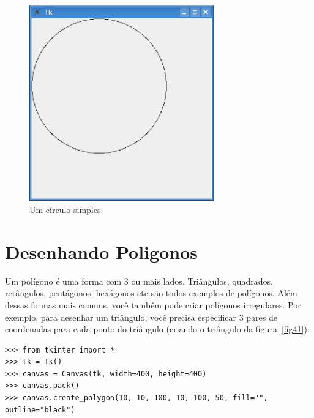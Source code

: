 \begin{figure}
\begin{center}
\includegraphics[width=80mm]{eps/figure40.eps}
\end{center}
\caption{Um círculo simples.}\label{fig40}
\end{figure}

\section{Desenhando Poligonos}

Um polígono é uma forma com 3 ou mais lados. Triângulos, quadrados, retângulos, pentágonos, hexágonos etc são todos exemplos de polígonos. Além dessas formas mais comuns, você também pode criar polígonos irregulares. Por exemplo, para desenhar um triângulo, você precisa especificar 3 pares de coordenadas para cada ponto do triângulo (criando o triângulo da figura~\ref{fig41}):

\begin{listing}
\begin{verbatim}
>>> from tkinter import *
>>> tk = Tk()
>>> canvas = Canvas(tk, width=400, height=400)
>>> canvas.pack()
>>> canvas.create_polygon(10, 10, 100, 10, 100, 50, fill="", outline="black")
\end{verbatim}
\end{listing}

